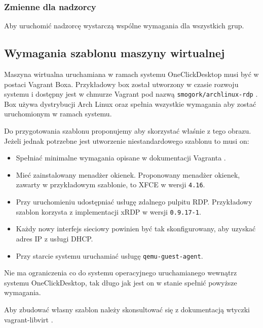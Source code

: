 \documentclass[../opis-rozwiazania.tex]{subfiles}
\begin{document}
\subsubsection{Zmienne dla nadzorcy}
Aby uruchomić nadzorcę wystarczą wspólne wymagania dla wszystkich grup.

\subsection{Wymagania szablonu maszyny wirtualnej}
\label{system_requirements.vagrant_box}
Maszyna wirtualna uruchamiana w ramach systemu OneClickDesktop musi być w postaci Vagrant Boxa.
Przykładowy box został utworzony w czasie rozwoju systemu i dostępny jest w chmurze Vagrant pod nazwą \texttt{smogork/archlinux-rdp} \parencite{ocd-vbox}.
Box używa dystrybucji Arch Linux oraz spełnia wszystkie wymagania aby zostać uruchomionym w ramach systemu.

Do przygotowania szablonu proponujemy aby skorzystać właśnie z tego obrazu.
Jeżeli jednak potrzebne jest utworzenie niestandardowego szablonu to musi on:
\begin{itemize}
  \item Spełniać minimalne wymagania opisane w dokumentacji Vagranta \parencite{vagrant-basebox}.
  \item Mieć zainstalowany menadżer okienek. Proponowany menadżer okienek, zawarty w przykładowym szablonie, to XFCE w wersji \texttt{4.16}.
  \item Przy uruchomieniu udostępniać usługę zdalnego pulpitu RDP. Przykładowy szablon korzysta z implementacji xRDP w wersji \texttt{0.9.17-1}. %
  \item Każdy nowy interfejs sieciowy powinien być tak skonfigurowany, aby uzyskać adres IP z usługi DHCP.
  \item Przy starcie systemu uruchamiać usługę \texttt{qemu-guest-agent}.
\end{itemize}
Nie ma ograniczenia co do systemu operacyjnego uruchamianego wewnątrz systemu OneClickDesktop, tak długo jak jest on w stanie spełnić powyższe wymagania.

Aby zbudować własny szablon należy skonsultować się z dokumentacją wtyczki vagrant-libvirt \parencite{vlibvirt-box}.
\end{document}
